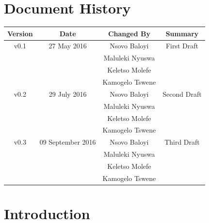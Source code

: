 \documentclass[a4paper,12pt]{article}
\begin{document}
	\newpage
	
	\tableofcontents
	\newpage
	\section*{Document History}
	
	\begin{table}[h!]
		
		\centering %
		\begin{tabular}{c c c c} %
			\hline\hline %
			Version & Date & Changed By & Summary \\ [0.5ex] %
			\hline %
			v0.1 & 27 May 2016 & Nsovo Baloyi & First Draft 
			\\ & & Maluleki Nyuswa &  
			\\ & & Keletso Molefe &
			\\ & & Kamogelo Tswene & \\ [1ex] 
			\hline
			v0.2 & 29 July 2016 & Nsovo Baloyi & Second Draft 
			\\ & & Maluleki Nyuswa &  
			\\ & & Keletso Molefe &
			\\ & & Kamogelo Tswene & \\ [1ex] 
			\hline
			v0.3 & 09 September 2016 & Nsovo Baloyi & Third Draft 
			\\ & & Maluleki Nyuswa &  
			\\ & & Keletso Molefe &
			\\ & & Kamogelo Tswene & \\ [1ex] 
			\hline \hline
		\end{tabular}
		\label{table:nonlin} %
	\end{table}

	\newpage
	
	\section{Introduction}	
	
	
\end{document}
